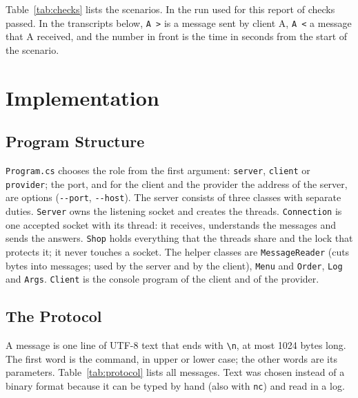 \documentclass[12pt,a4paper]{article}
\begin{document}
Table~\ref{tab:checks} lists the scenarios. In the run used for this report \checksPassed{} of \checksTotal{} checks passed. In the transcripts below, \texttt{A >} is a message sent by client A, \texttt{A <} a message that A received, and the number in front is the time in seconds from the start of the scenario.

\begin{table}[H]
  \centering
  \caption{The scenarios of \texttt{tests/scenarios.py} and their checks}
  \small
  
  \label{tab:checks}
\end{table}

\newpage
\section{Implementation}

\subsection{Program Structure}

\texttt{Program.cs} chooses the role from the first argument: \texttt{server}, \texttt{client} or \texttt{provider}; the port, and for the client and the provider the address of the server, are options (\texttt{-{}-port}, \texttt{-{}-host}). The server consists of three classes with separate duties. \texttt{Server} owns the listening socket and creates the threads. \texttt{Connection} is one accepted socket with its thread: it receives, understands the messages and sends the answers. \texttt{Shop} holds everything that the threads share and the lock that protects it; it never touches a socket. The helper classes are \texttt{MessageReader} (cuts bytes into messages; used by the server and by the client), \texttt{Menu} and \texttt{Order}, \texttt{Log} and \texttt{Args}. \texttt{Client} is the console program of the client and of the provider.

\subsection{The Protocol}

A message is one line of UTF-8 text that ends with \texttt{\textbackslash n}, at most 1024 bytes long. The first word is the command, in upper or lower case; the other words are its parameters. Table~\ref{tab:protocol} lists all messages. Text was chosen instead of a binary format because it can be typed by hand (also with \texttt{nc}) and read in a log.
\end{document}
